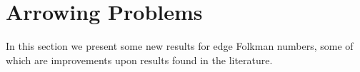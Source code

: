 \documentclass[paper=a4, fontsize=11pt]{scrartcl} %
\begin{document}





\section{Arrowing Problems}
In this section we present some new results for edge Folkman numbers, some of which are improvements
upon results found in the literature.

\label{sec:arrowComputations}
\end{document}
